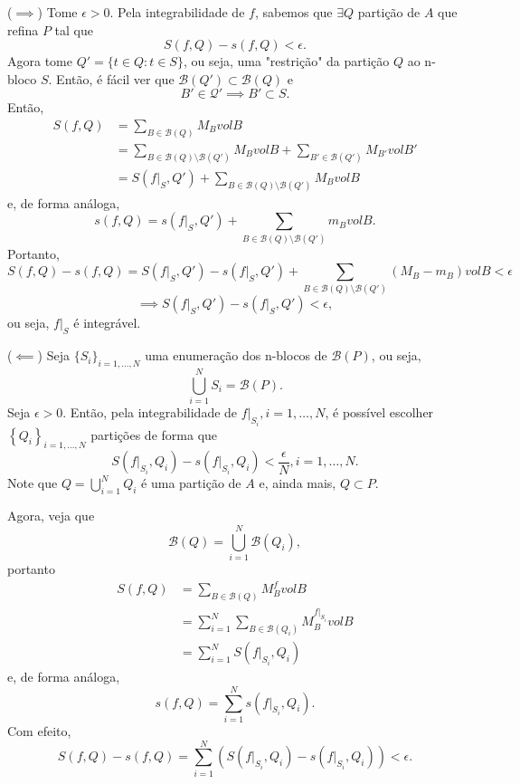 \documentclass[a4paper]{report}
\begin{document}
($\implies$)
Tome $\epsilon>0$. Pela integrabilidade de $f$, sabemos que $\exists Q$ partição de $A$ que refina $P$ tal que  \[
S\left( f, Q \right) -s\left( f, Q\right) < \epsilon
.\] 
Agora tome $Q' = \{t\in Q : t \in S\} $, ou seja, uma "restrição" da partição $Q$ ao n-bloco $S$. Então, é fácil ver que $\mathcal{B}\left( Q' \right) \subset \mathcal{B}\left( Q \right) $ e \[
B'\in \mathcal{Q'} \implies B'\subset S
.\] Então,
\begin{align*}
    S\left( f,Q \right) &= \sum_{B\in \mathcal{B}\left( Q \right) } M_B vol B \\
			&= \sum_{B\in \mathcal{B}\left( Q \right)\setminus\mathcal{B}\left( Q' \right)  } M_B vol B + \sum_{B'\in \mathcal{B}\left( Q' \right) } M_{B'} vol B' \\
			&= S\left( f|_{S} , Q'\right) + \sum_{B\in \mathcal{B}\left( Q \right)\setminus\mathcal{B}\left( Q' \right)  } M_B vol B
\end{align*}
e, de forma análoga, \[
			s\left( f,Q \right) = s\left( f|_{S} , Q'\right) + \sum_{B\in \mathcal{B}\left( Q \right)\setminus\mathcal{B}\left( Q' \right)  } m_B vol B
.\] Portanto, \[
S\left( f, Q \right) -s\left( f, Q\right) = S\left( f|_{S}, Q' \right) - s\left( f|_{S}, Q' \right) +\sum_{B\in \mathcal{B}\left( Q \right)\setminus\mathcal{B}\left( Q' \right)  } \left( M_B - m_B \right) vol B  < \epsilon
\] \[
\implies S\left( f|_{S}, Q' \right) - s\left( f|_{S}, Q' \right) < \epsilon
,\] ou seja, $f|_{S}$ é integrável.

($\impliedby$)
Seja $\{S_i\} _{i=1,\ldots,N}$ uma enumeração dos n-blocos de $\mathcal{B}\left( P \right) $, ou seja, \[
\bigcup_{i=1}^{N}S_i = \mathcal{B}\left( P \right) 
.\] Seja $\epsilon>0$. Então, pela integrabilidade de $f|_{S_i}, i=1,\ldots,N$, é possível escolher $\left\{ Q_i \right\} _{i=1,\ldots,N}$ partições de forma que \[
S\left( f|_{S_i},Q_i \right) - s\left( f|_{S_i},Q_i \right) < \frac{\epsilon}{N}  , i=1,\ldots,N
.\] Note que $Q=\bigcup_{i=1}^{N}Q_i$ é uma partição de $A$ e, ainda mais, $Q\subset P$.

Agora, veja que \[
\mathcal{B}\left( Q \right) = \bigcup_{i=1}^{N}\mathcal{B}\left( Q_i \right) 
,\] portanto
\begin{align*}
    S\left( f,Q \right) &= \sum_{B\in \mathcal{B}\left( Q \right) } M_B^{f} vol B \\
			&= \sum_{i=1}^{N} \sum_{B\in \mathcal{B}\left( Q_i \right) } M_B^{f|_{S_i}} vol B \\
			&= \sum_{i=1}^{N} S\left( f|_{S_i}, Q_i \right)
\end{align*}
e, de forma análoga, \[
s\left( f, Q \right) = \sum_{i=1}^{N} s\left( f|_{S_i}, Q_i \right)
.\] 
Com efeito, \[
S\left( f, Q \right) - s\left( f,Q \right) = \sum_{i=1}^{N} \left( S\left( f|_{S_i}, Q_i \right) - s\left( f|_{S_i}, Q_i \right)\right) < \epsilon
.\] 
\end{document}
